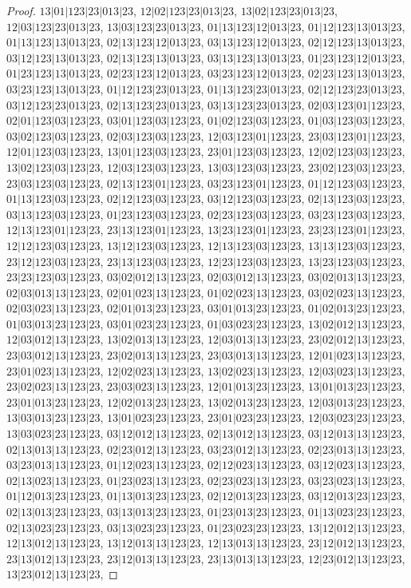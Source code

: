 \documentclass[12pt]{article}
\theoremstyle{plain}
\theoremstyle{definition}
\theoremstyle{remark}
\begin{document}
\begin{proof}
$13|01|123|23|013|23$, $12|02|123|23|013|23$, $13|02|123|23|013|23$, $12|03|123|23|013|23$, $13|03|123|23|013|23$, $01|13|123|12|013|23$, $01|12|123|13|013|23$, $01|13|123|13|013|23$, $02|13|123|12|013|23$, $03|13|123|12|013|23$, $02|12|123|13|013|23$, $03|12|123|13|013|23$, $02|13|123|13|013|23$, $03|13|123|13|013|23$, $01|23|123|12|013|23$, $01|23|123|13|013|23$, $02|23|123|12|013|23$, $03|23|123|12|013|23$, $02|23|123|13|013|23$, $03|23|123|13|013|23$, $01|12|123|23|013|23$, $01|13|123|23|013|23$, $02|12|123|23|013|23$, $03|12|123|23|013|23$, $02|13|123|23|013|23$, $03|13|123|23|013|23$, $02|03|123|01|123|23$, $02|01|123|03|123|23$, $03|01|123|03|123|23$, $01|02|123|03|123|23$, $01|03|123|03|123|23$, $03|02|123|03|123|23$, $02|03|123|03|123|23$, $12|03|123|01|123|23$, $23|03|123|01|123|23$, $12|01|123|03|123|23$, $13|01|123|03|123|23$, $23|01|123|03|123|23$, $12|02|123|03|123|23$, $13|02|123|03|123|23$, $12|03|123|03|123|23$, $13|03|123|03|123|23$, $23|02|123|03|123|23$, $23|03|123|03|123|23$, $02|13|123|01|123|23$, $03|23|123|01|123|23$, $01|12|123|03|123|23$, $01|13|123|03|123|23$, $02|12|123|03|123|23$, $03|12|123|03|123|23$, $02|13|123|03|123|23$, $03|13|123|03|123|23$, $01|23|123|03|123|23$, $02|23|123|03|123|23$, $03|23|123|03|123|23$, $12|13|123|01|123|23$, $23|13|123|01|123|23$, $13|23|123|01|123|23$, $23|23|123|01|123|23$, $12|12|123|03|123|23$, $13|12|123|03|123|23$, $12|13|123|03|123|23$, $13|13|123|03|123|23$, $23|12|123|03|123|23$, $23|13|123|03|123|23$, $12|23|123|03|123|23$, $13|23|123|03|123|23$, $23|23|123|03|123|23$, $03|02|012|13|123|23$, $02|03|012|13|123|23$, $03|02|013|13|123|23$, $02|03|013|13|123|23$, $02|01|023|13|123|23$, $01|02|023|13|123|23$, $03|02|023|13|123|23$, $02|03|023|13|123|23$, $02|01|013|23|123|23$, $03|01|013|23|123|23$, $01|02|013|23|123|23$, $01|03|013|23|123|23$, $03|01|023|23|123|23$, $01|03|023|23|123|23$, $13|02|012|13|123|23$, $12|03|012|13|123|23$, $13|02|013|13|123|23$, $12|03|013|13|123|23$, $23|02|012|13|123|23$, $23|03|012|13|123|23$, $23|02|013|13|123|23$, $23|03|013|13|123|23$, $12|01|023|13|123|23$, $23|01|023|13|123|23$, $12|02|023|13|123|23$, $13|02|023|13|123|23$, $12|03|023|13|123|23$, $23|02|023|13|123|23$, $23|03|023|13|123|23$, $12|01|013|23|123|23$, $13|01|013|23|123|23$, $23|01|013|23|123|23$, $12|02|013|23|123|23$, $13|02|013|23|123|23$, $12|03|013|23|123|23$, $13|03|013|23|123|23$, $13|01|023|23|123|23$, $23|01|023|23|123|23$, $12|03|023|23|123|23$, $13|03|023|23|123|23$, $03|12|012|13|123|23$, $02|13|012|13|123|23$, $03|12|013|13|123|23$, $02|13|013|13|123|23$, $02|23|012|13|123|23$, $03|23|012|13|123|23$, $02|23|013|13|123|23$, $03|23|013|13|123|23$, $01|12|023|13|123|23$, $02|12|023|13|123|23$, $03|12|023|13|123|23$, $02|13|023|13|123|23$, $01|23|023|13|123|23$, $02|23|023|13|123|23$, $03|23|023|13|123|23$, $01|12|013|23|123|23$, $01|13|013|23|123|23$, $02|12|013|23|123|23$, $03|12|013|23|123|23$, $02|13|013|23|123|23$, $03|13|013|23|123|23$, $01|23|013|23|123|23$, $01|13|023|23|123|23$, $02|13|023|23|123|23$, $03|13|023|23|123|23$, $01|23|023|23|123|23$, $13|12|012|13|123|23$, $12|13|012|13|123|23$, $13|12|013|13|123|23$, $12|13|013|13|123|23$, $23|12|012|13|123|23$, $23|13|012|13|123|23$, $23|12|013|13|123|23$, $23|13|013|13|123|23$, $12|23|012|13|123|23$, $13|23|012|13|123|23$, 
\end{proof}
\end{document}
